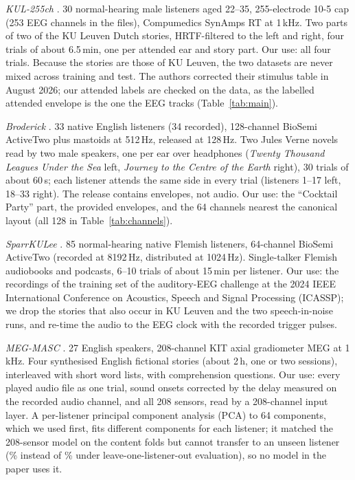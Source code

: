 \emph{KUL-255ch} \citep{narayanan2021uhd}. 30 normal-hearing male listeners aged 22--35,
255-electrode 10-5 cap (253 EEG channels in the files), Compumedics SynAmps RT at 1\,kHz.
Two parts of two of the KU Leuven Dutch stories, HRTF-filtered to the left and right, four
trials of about 6.5\,min, one per attended ear and story part. Our use: all four trials.
Because the stories are those of KU Leuven, the two datasets are never mixed across training
and test. The authors corrected their stimulus table in August 2026; our attended labels are
checked on the data, as the labelled attended envelope is the one the EEG tracks
(Table~\ref{tab:main}).

\emph{Broderick} \citep{broderick2018semantic}. 33 native English listeners (34 recorded),
128-channel BioSemi ActiveTwo plus mastoids at 512\,Hz, released at 128\,Hz. Two Jules Verne
novels read by two male speakers, one per ear over headphones (\emph{Twenty Thousand Leagues
Under the Sea} left, \emph{Journey to the Centre of the Earth} right), 30 trials of about
60\,s; each listener attends the same side in every trial (listeners 1--17 left, 18--33
right). The release contains envelopes, not audio. Our use: the ``Cocktail Party'' part,
the provided envelopes, and the 64 channels nearest the canonical layout (all 128 in
Table~\ref{tab:channels}).

\emph{SparrKULee} \citep{accou2024sparrkulee}. 85 normal-hearing native Flemish listeners,
64-channel BioSemi ActiveTwo (recorded at 8192\,Hz, distributed at 1024\,Hz). Single-talker
Flemish audiobooks and podcasts, 6--10 trials of about 15\,min per listener. Our use: the
recordings of the training set of the auditory-EEG challenge at the 2024 IEEE International
Conference on Acoustics, Speech and Signal Processing (ICASSP); we drop the stories that
also occur in KU Leuven and the two speech-in-noise runs, and re-time the audio to the EEG
clock with the recorded trigger pulses.

\emph{MEG-MASC} \citep{gwilliams2023megmasc}. 27 English speakers, 208-channel KIT axial
gradiometer MEG at 1\,kHz. Four synthesised English fictional stories (about 2\,h, one or two
sessions), interleaved with short word lists, with comprehension questions. Our use: every
played audio file as one trial, sound onsets corrected by the delay measured on the recorded
audio channel, and all 208 sensors, read by a 208-channel input layer. A per-listener
principal component analysis (PCA) to 64 components, which we used first, fits different components for each listener; it
matched the 208-sensor model on the content folds but cannot transfer to an unseen listener
(\losoMEGpca\% instead of \losoMEGFive\% under leave-one-listener-out evaluation), so no model in the paper uses it.

